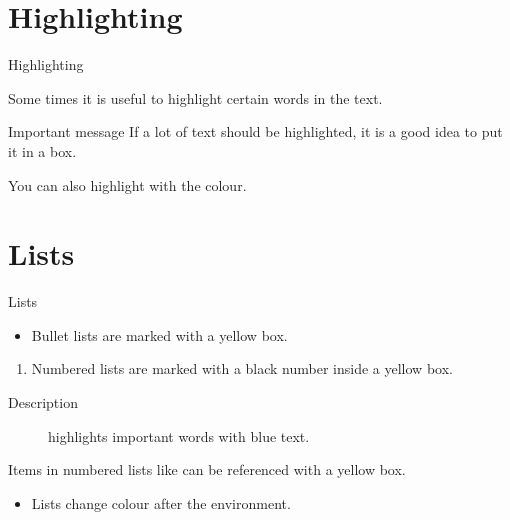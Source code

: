 \documentclass[UKenglish, aspectratio = 169]{beamer}
\begin{document}
\section{Highlighting}
\SectionPage

\begin{frame}{Highlighting}

    Some times it is useful to \alert{highlight} certain words in the text.

    \begin{alertblock}{Important message}
        If a lot of text should be \alert{highlighted}, it is a good idea to put it in a box.
    \end{alertblock}

    You can also highlight with the  colour.
\end{frame}

\section{Lists}

\begin{frame}{Lists}

    \begin{itemize}
        \item
        Bullet lists are marked with a yellow box.
    \end{itemize}

    \begin{enumerate}
        \item
        \label{enum:item}
        Numbered lists are marked with a black number inside a yellow box.
    \end{enumerate}

    \begin{description}
        \item[Description] highlights important words with blue text.
    \end{description}

    Items in numbered lists like  can be referenced with a yellow box.

    \begin{example}
        \begin{itemize}
            \item
            Lists change colour after the environment.
        \end{itemize}
    \end{example}
\end{frame}
\end{document}
